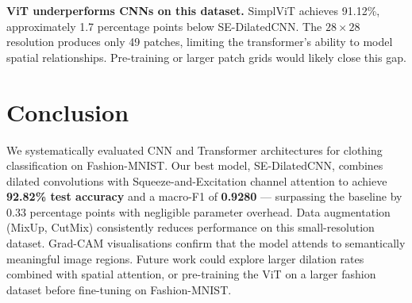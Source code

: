 \documentclass[10pt,a4paper]{article}
\begin{document}
\textbf{ViT underperforms CNNs on this dataset.}
SimplViT achieves 91.12\%, approximately 1.7 percentage points below SE-DilatedCNN.
The $28\!\times\!28$ resolution produces only 49 patches, limiting the transformer's ability to model spatial relationships.
Pre-training or larger patch grids would likely close this gap.

\section{Conclusion}

We systematically evaluated CNN and Transformer architectures for clothing classification on Fashion-MNIST.
Our best model, SE-DilatedCNN, combines dilated convolutions with Squeeze-and-Excitation channel attention to achieve \textbf{92.82\% test accuracy} and a macro-F1 of \textbf{0.9280} — surpassing the baseline by 0.33 percentage points with negligible parameter overhead.
Data augmentation (MixUp, CutMix) consistently reduces performance on this small-resolution dataset.
Grad-CAM visualisations confirm that the model attends to semantically meaningful image regions.
Future work could explore larger dilation rates combined with spatial attention, or pre-training the ViT on a larger fashion dataset before fine-tuning on Fashion-MNIST.
\end{document}
